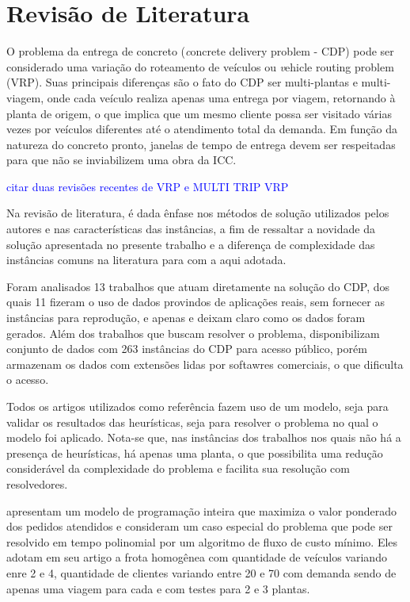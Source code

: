 \chapter{Revisão de Literatura}
O problema da entrega de concreto ({\textit concrete delivery problem} - CDP) pode ser considerado uma variação do roteamento de veículos ou {\textit vehicle routing problem} (VRP). Suas principais diferenças são o fato do CDP ser multi-plantas e multi-viagem, onde cada veículo
realiza apenas uma entrega  por viagem, retornando à planta de origem,
o que implica que um mesmo cliente possa ser visitado várias vezes
por veículos diferentes até o atendimento total da demanda.
Em função da natureza do concreto pronto, janelas de tempo de entrega
devem ser respeitadas para que não se inviabilizem uma obra da ICC.

\textcolor{blue}{citar duas revisões recentes de VRP e MULTI TRIP VRP}

Na revisão de literatura, é dada ênfase nos métodos de solução utilizados pelos autores e nas características das instâncias, a fim de ressaltar a novidade da solução apresentada no presente trabalho e a diferença de complexidade das instâncias comuns na literatura para com a aqui adotada.

Foram analisados 13 trabalhos que atuam diretamente na solução do CDP, dos quais 11 fizeram o uso de dados provindos de aplicações reais, sem fornecer as instâncias para reprodução, e apenas \cite{tabref1}  e \cite{kinable} deixam claro como os dados foram gerados. Além dos trabalhos que buscam resolver o problema, \cite{dados} disponibilizam conjunto de dados com 263 instâncias do CDP para acesso público, porém armazenam os dados com extensões lidas por softawres comerciais, o que dificulta o acesso. 

Todos os artigos utilizados como referência fazem uso de um modelo, seja para validar os resultados das heurísticas, seja para resolver o problema no qual o modelo foi aplicado. Nota-se que, nas instâncias dos trabalhos nos quais não há a presença de heurísticas, há apenas uma planta, o que possibilita uma redução considerável da complexidade do problema e facilita sua resolução com resolvedores. 

\cite{tabref1} apresentam um modelo de programação inteira que maximiza o valor ponderado dos pedidos atendidos e consideram um caso especial do problema que pode ser resolvido em tempo polinomial por um algoritmo de fluxo de custo mínimo. Eles adotam em seu artigo a frota homogênea com quantidade de veículos variando enre 2 e 4, quantidade de clientes variando entre 20 e 70 com demanda sendo de apenas uma viagem para cada e com testes para 2 e 3 plantas.  

